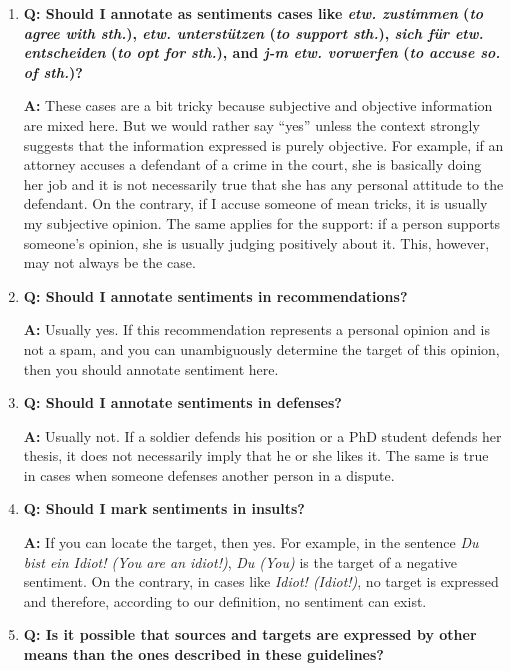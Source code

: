 \documentclass[11pt,a4paper]{article}
\theoremstyle{mytheoremstyle}
\begin{document}
\begin{enumerate}
\item\textbf{Q: Should I annotate as sentiments cases like
  \textit{etw. zustimmen} (\textit{to agree with sth.}), \textit{etw.
    unterst\"utzen} (\textit{to support sth.}), \textit{sich f\"ur
    etw. entscheiden} (\textit{to opt for sth.}), and \textit{j-m
    etw. vorwerfen} (\textit{to accuse so. of sth.})?}

  \textbf{A:} These cases are a bit tricky because subjective and
  objective information are mixed here.  But we would rather say
  ``yes'' unless the context strongly suggests that the information
  expressed is purely objective.  For example, if an attorney accuses
  a defendant of a crime in the court, she is basically doing her job
  and it is not necessarily true that she has any personal attitude to
  the defendant.  On the contrary, if I accuse someone of mean tricks,
  it is usually my subjective opinion.  The same applies for the
  support: if a person supports someone's opinion, she is usually
  judging positively about it.  This, however, may not always be the
  case.

\item\textbf{Q: Should I annotate sentiments in recommendations?}

  \textbf{A:} Usually yes.  If this recommendation represents a
  personal opinion and is not a spam, and you can unambiguously
  determine the target of this opinion, then you should annotate
  sentiment here.

\item\textbf{Q: Should I annotate sentiments in defenses?}

  \textbf{A:} Usually not.  If a soldier defends his position or a PhD
  student defends her thesis, it does not necessarily imply that he or
  she likes it.  The same is true in cases when someone defenses
  another person in a dispute.

\item\textbf{Q: Should I mark sentiments in insults?}

  \textbf{A:} If you can locate the target, then yes.  For example, in
  the sentence \textit{Du bist ein Idiot! (You are an idiot!)},
  \textit{Du (You)} is the target of a negative sentiment.  On the
  contrary, in cases like \textit{Idiot!  (Idiot!)}, no target is
  expressed and therefore, according to our definition, no sentiment
  can exist.

\item\textbf{Q: Is it possible that sources and targets are expressed
  by other means than the ones described in these guidelines?}


\end{enumerate}
\end{document}
